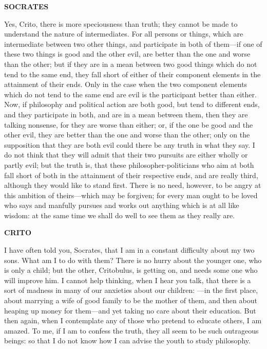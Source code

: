 \documentclass[11pt,letter]{article}
\begin{document}
\par \textbf{SOCRATES}
\par   Yes, Crito, there is more speciousness than truth; they cannot be made to understand the nature of intermediates. For all persons or things, which are intermediate between two other things, and participate in both of them—if one of these two things is good and the other evil, are better than the one and worse than the other; but if they are in a mean between two good things which do not tend to the same end, they fall short of either of their component elements in the attainment of their ends. Only in the case when the two component elements which do not tend to the same end are evil is the participant better than either. Now, if philosophy and political action are both good, but tend to different ends, and they participate in both, and are in a mean between them, then they are talking nonsense, for they are worse than either; or, if the one be good and the other evil, they are better than the one and worse than the other; only on the supposition that they are both evil could there be any truth in what they say. I do not think that they will admit that their two pursuits are either wholly or partly evil; but the truth is, that these philosopher-politicians who aim at both fall short of both in the attainment of their respective ends, and are really third, although they would like to stand first. There is no need, however, to be angry at this ambition of theirs—which may be forgiven; for every man ought to be loved who says and manfully pursues and works out anything which is at all like wisdom:  at the same time we shall do well to see them as they really are.

\par \textbf{CRITO}
\par   I have often told you, Socrates, that I am in a constant difficulty about my two sons. What am I to do with them? There is no hurry about the younger one, who is only a child; but the other, Critobulus, is getting on, and needs some one who will improve him. I cannot help thinking, when I hear you talk, that there is a sort of madness in many of our anxieties about our children: —in the first place, about marrying a wife of good family to be the mother of them, and then about heaping up money for them—and yet taking no care about their education. But then again, when I contemplate any of those who pretend to educate others, I am amazed. To me, if I am to confess the truth, they all seem to be such outrageous beings:  so that I do not know how I can advise the youth to study philosophy.
\end{document}
